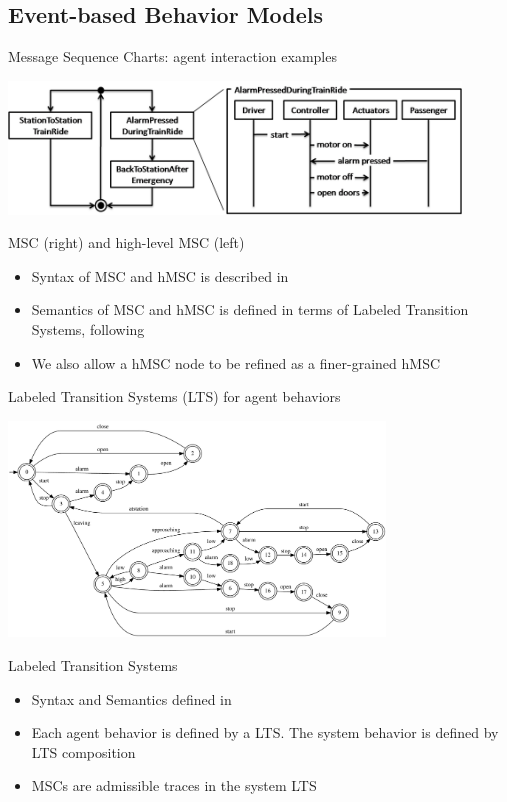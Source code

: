 \documentclass[11pt]{beamer}
\begin{document}
\subsection{Event-based Behavior Models}
\begin{frame}{Message Sequence Charts:  agent interaction examples}
	\begin{center}
		\includegraphics[width=12cm]{Train_hMSC_MSC.png}
	\end{center}
	\begin{block}{MSC (right) and high-level MSC (left)}
		\begin{itemize}
			\item Syntax of MSC and hMSC is described in \cite{ITU96}
			\item Semantics of MSC and hMSC is defined in terms of Labeled Transition Systems, following \cite{Uchitel03}
			\item We also allow a hMSC node to be refined as a finer-grained hMSC
		\end{itemize}
	\end{block}
\end{frame}

\begin{frame}{Labeled Transition Systems (LTS) for agent behaviors}
	\vspace{-0.5cm}
	\begin{center}
		\includegraphics[width=10cm]{bigtrain.pdf}
	\end{center}
	\vspace{-1.5cm}
	\begin{block}{Labeled Transition Systems}
		\begin{itemize}
			\item Syntax and Semantics defined in \cite{Magee99}
			\item Each agent behavior is defined by a LTS. The system behavior is defined by LTS composition \cite{Magee99}
			\item MSCs are admissible traces in the system LTS \cite{Uchitel03}
		\end{itemize}
	\end{block}
\end{frame}
\end{document}
